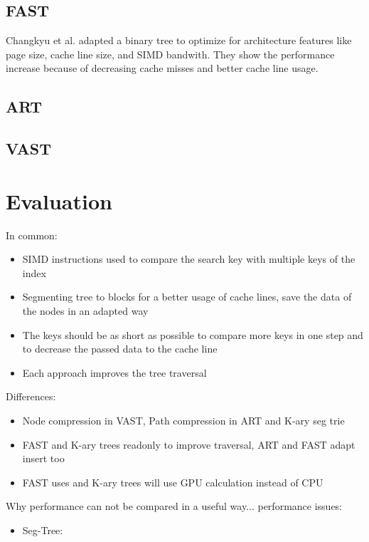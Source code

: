 \documentclass[conference]{IEEEtran}
\begin{document}

\subsection{FAST}\label{SCM}
Changkyu et al. adapted a binary tree to optimize for architecture features like page size, cache line size, and SIMD bandwith. They show the performance increase because of decreasing cache misses and better cache line usage.  
\subsection{ART}\label{SCM}

\subsection{VAST}\label{SCM}

\section{Evaluation}
In common:
\begin{itemize}
	\item SIMD instructions used to compare the search key with multiple keys of the index
	\item Segmenting tree to blocks for a better usage of cache lines, save the data of the nodes in an adapted way
	\item The keys should be as short as possible to compare more keys in one step and to decrease the passed data to the cache line
	\item Each approach improves the tree traversal
\end{itemize}

Differences:
\begin{itemize}
	\item Node compression in VAST, Path compression in ART and K-ary seg trie
	\item FAST and K-ary trees readonly to improve traversal, ART and FAST adapt insert too
	\item FAST uses and K-ary trees will use GPU calculation instead of CPU
\end{itemize}

Why performance can not be compared in a useful way...
performance issues:
\begin{itemize}
	\item Seg-Tree: 
\end{itemize}
\end{document}
